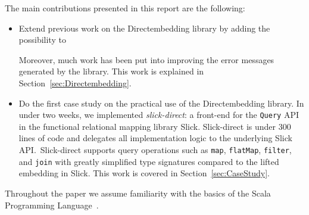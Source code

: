 \documentclass[11pt,a4paper]{article}
\begin{document}
The main contributions presented in this report are the following:
\begin{itemize}
    \item Extend previous work on the Directembedding library by adding the possibility to
        Moreover, much work has been put into improving the error messages generated by the library.
        This work is explained in Section~\ref{sec:Directembedding}.
    \item Do the first case study on the practical use of the Directembedding library.
        In under two weeks, we implemented \emph{slick-direct}: a front-end for the \texttt{Query} API in the functional relational mapping library Slick.
        Slick-direct is under 300 lines of code and delegates all implementation logic to the underlying Slick API.\
        Slick-direct supports query operations such as \texttt{map}, \texttt{flatMap}, \texttt{filter}, and \texttt{join} with greatly simplified type signatures compared to the lifted embedding in Slick.
        This work is covered in Section~\ref{sec:CaseStudy}.
\end{itemize}
Throughout the paper we assume familiarity with the basics of the Scala Programming Language~\autocite{odersky_scala_2004}.





\printbibliography{}
\end{document}

